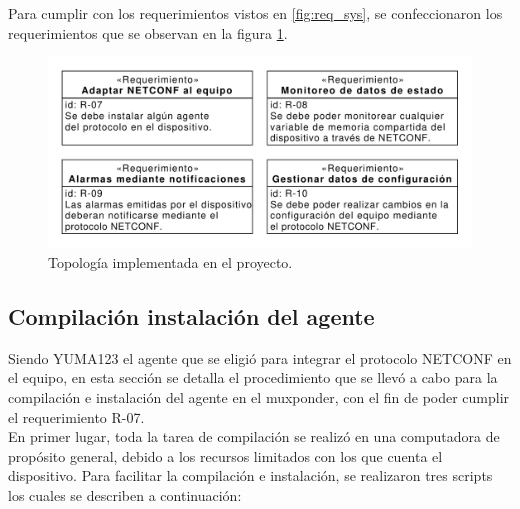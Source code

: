   Para cumplir con los requerimientos vistos en \ref{fig:req_sys}, se confeccionaron los requerimientos que se observan en la figura \ref{fig:req_netconf}.

  \begin{figure}[H]
    \centering
    \includegraphics[scale=0.65]{Figures/req_netconf.pdf}
    \caption{Topología implementada en el proyecto.}
    \label{fig:req_netconf}
  \end{figure}


  \subsection{Compilación instalación del agente}
Siendo YUMA123 el agente que se eligió para integrar el protocolo NETCONF en el equipo, en esta sección se detalla el procedimiento que se llevó a cabo para la compilación e instalación del agente en el muxponder, con el fin de poder cumplir el requerimiento R-07.
\\

  En primer lugar, toda la tarea de compilación se realizó en una computadora de propósito general, debido a los recursos limitados con los que cuenta el dispositivo. Para facilitar la compilación e instalación, se realizaron tres scripts los cuales se describen a continuación:

